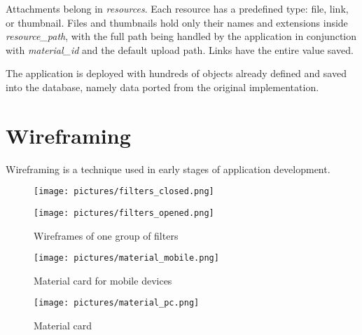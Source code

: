 \documentclass[
  digital,     %
  oneside,     %
  nosansbold,  %
  colorbold, %
  lof,         %
  lot,         %
]{fithesis4}
\begin{document}
Attachments belong in \textit{resources}. Each resource has a predefined type: file, link, or thumbnail. Files and thumbnails hold only their names and extensions inside \textit{resource\_path}, with the full path being handled by the application in conjunction with \textit{material\_id} and the default upload path. Links have the entire value saved.

The application is deployed with hundreds of objects already defined and saved into the database, namely data ported from the original implementation.

\section{Wireframing}

Wireframing is a technique used in early stages of application development. 
\begin{figure}
	\begin{center}
		\begin{minipage}{.3\textwidth}
			\texttt{[image: pictures/filters\_closed.png]}
		\end{minipage}
		\begin{minipage}{.3\textwidth}
			\texttt{[image: pictures/filters\_opened.png]}
		\end{minipage}
	\end{center}
	\caption{Wireframes of one group of filters}
	\label{fig:filters}
\end{figure}

\begin{figure}
	\begin{center}
		\begin{minipage}{.35\textwidth}
			\texttt{[image: pictures/material\_mobile.png]}
		\end{minipage}
	\end{center}
	\caption{Material card for mobile devices}
	\label{fig:mat-card-mobile}
\end{figure}

\begin{figure}
	\begin{center}
		\begin{minipage}{1\textwidth}
			\texttt{[image: pictures/material\_pc.png]}
		\end{minipage}
	\end{center}
	\caption{Material card}
	\label{fig:mat-card-pc}
\end{figure}
\end{document}
